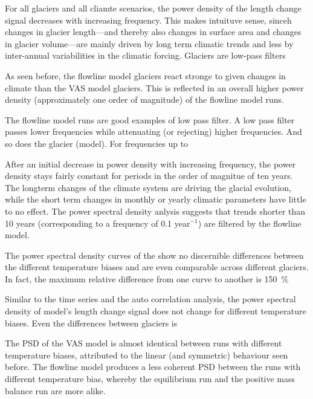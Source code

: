       For all glaciers and all cliamte scenarios, the power density of the length change signal decreases with increasing frequency. This makes intuituve sense, sinceh changes in glacier length---and thereby also changes in surface area and changes in glacier volume---are mainly driven by long term climatic trends and less by inter-annual variabilities in the climatic forcing. Glaciers are low-pass filters

      As seen before, the flowline model glaciers react stronge to given changes in climate than the VAS model glaciers. This is reflected in an overall higher power density (approximately one order of magnitude) of the flowline model runs.

      The flowline model runs are good examples of low pass filter. A low pass filter passes lower frequencies while attenuating (or rejecting) higher frequencies. And so does the glacier (model). For frequencies up to 

      After an initial decrease in power density with increasing frequency, the power density stays fairly constant for periods in the order of magnitue of ten years. The longterm changes of the climate system are driving the glacial evolution, while the short term changes in monthly or yearly climatic parameters have little to no effect. The power spectral density anlysis suggests that trends  shorter than 10 years (corresponding to a frequency of 0.1 year$^{-1}$) are filtered by the flowline model.

      The power spectral density curves of the \vas{} show no discernible differences between the different temperature biases and are even comparable across different glaciers. In fact, the maximum relative difference from one curve to another is \SI{150}{\percent}

      Similar to the time series and the auto correlation analysis, the power spectral density of \vas{} model’s length change signal does not change for different temperature biases. Even the differences between glaciers is 

      The PSD of the VAS model is almost identical between runs with different temperature biases, attributed to the linear (and symmetric) behaviour seen before. The flowline model produces a less coherent PSD between the runs with different temperature bias, whereby the equilibrium run and the positive mass balance run are more alike.


